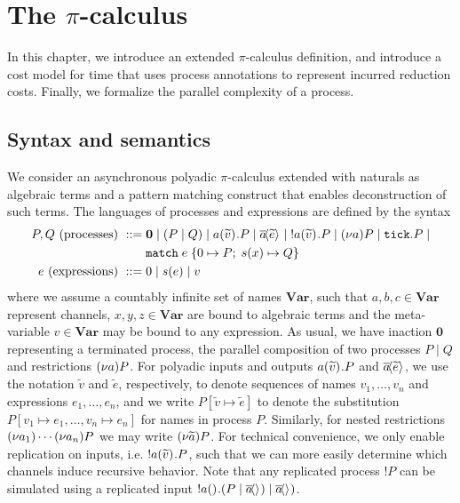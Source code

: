 \chapter{The $\pi$-calculus}\label{ch:picalc}

In this chapter, we introduce an extended $\pi$-calculus definition, and introduce a cost model for time that uses process annotations to represent incurred reduction costs. Finally, we formalize the parallel complexity of a process.


\section{Syntax and semantics}
We consider an asynchronous polyadic $\pi$-calculus extended with naturals as algebraic terms and a pattern matching construct that enables deconstruction of such terms. The languages of processes and expressions are defined by the syntax 
%
\begin{align*}
    P,Q \text{ (processes) } ::=&\; \mathbf{0} \mid \left(P \mid Q \right) \mid a(\widetilde{v})^{}.P \mid \overline{a}\!\langle \widetilde{e}\rangle^{} \mid\; ! a(\widetilde{v})^{}.P \mid (\nu a) P \mid \texttt{tick}.P \mid \\
    &\; \texttt{match}\; e\; \{ 0 \mapsto P;\; s(x) \mapsto Q \}\\
    e \text{ (expressions) } ::=&\; 0 \mid s(e) \mid v
\end{align*}
%
where we assume a countably infinite set of names $\textbf{Var}$, such that $a,b,c\in\textbf{Var}$ represent channels, $x,y,z\in\textbf{Var}$ are bound to algebraic terms and the meta-variable $v\in\textbf{Var}$ may be bound to any expression. As usual, we have inaction $\mathbf{0}$ representing a terminated process, the parallel composition of two processes $P \mid Q$ and restrictions $(\nu a) P$. 
For polyadic inputs and outputs $a(\widetilde{v})^{}.P$ and $\overline{a}\!\langle \widetilde{e}\rangle^{}$, we use the notation $\widetilde{v}$ and $\widetilde{e}$, respectively, to denote sequences of names $v_1,\dots,v_n$ and expressions $e_1,\dots,e_n$, and we write $P[\widetilde{v}\mapsto\widetilde{e}]$ to denote the substitution $P[v_1\mapsto e_1,\dots,v_n\mapsto e_n]$ for names in process $P$. Similarly, for nested restrictions $(\nu a_1) \cdots (\nu a_n) P$ we may write $(\nu \widetilde{a}) P$. For technical convenience, we only enable replication on inputs, i.e. $!a(\widetilde{v})^{}.P$, such that we can more easily determine which channels induce recursive behavior. Note that any replicated process $!P$ can be simulated using a replicated input $!a()^{}.(P \mid \overline{a}\!\langle \rangle^{}) \mid \overline{a}\!\langle \rangle^{})$.\\ 

